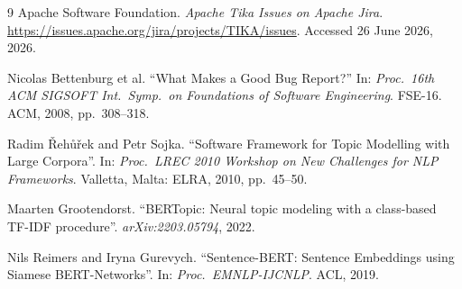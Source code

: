 \documentclass[11pt,a4paper]{report}
\begin{document}
\begin{thebibliography}{9}
Apache Software Foundation. \emph{Apache Tika Issues on Apache Jira}.
\url{https://issues.apache.org/jira/projects/TIKA/issues}. Accessed 26 June
2026, 2026.

Nicolas Bettenburg et al. ``What Makes a Good Bug Report?'' In: \emph{Proc.\ 16th
ACM SIGSOFT Int.\ Symp.\ on Foundations of Software Engineering}. FSE-16. ACM,
2008, pp.\ 308--318.

Radim \v{R}eh\r{u}\v{r}ek and Petr Sojka. ``Software Framework for Topic
Modelling with Large Corpora''. In: \emph{Proc.\ LREC 2010 Workshop on New
Challenges for NLP Frameworks}. Valletta, Malta: ELRA, 2010, pp.\ 45--50.

Maarten Grootendorst. ``BERTopic: Neural topic modeling with a class-based
TF-IDF procedure''. \emph{arXiv:2203.05794}, 2022.

Nils Reimers and Iryna Gurevych. ``Sentence-BERT: Sentence Embeddings using
Siamese BERT-Networks''. In: \emph{Proc.\ EMNLP-IJCNLP}. ACL, 2019.
\end{thebibliography}
\end{document}
